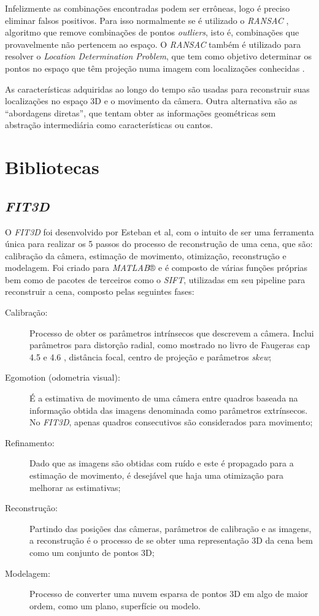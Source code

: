 Infelizmente as combinações encontradas podem ser errôneas, logo é preciso eliminar falsos positivos. Para isso normalmente se é utilizado o \textit{RANSAC} , algoritmo que remove combinações de pontos \textit{outliers}, isto é, combinações que provavelmente não pertencem ao espaço. O \textit{RANSAC} também é utilizado para resolver o \textit{Location Determination Problem}, que tem como objetivo determinar os pontos no espaço que têm projeção numa imagem com localizações conhecidas \cite{RANSAC}.

As características adquiridas ao longo do tempo são usadas para reconstruir suas localizações no espaço 3D e o movimento da câmera. Outra alternativa são as “abordagens diretas”, que tentam obter as informações geométricas sem abstração intermediária como características ou cantos.

\section{Bibliotecas}

\subsection{\textit{FIT3D}}
O \textit{FIT3D} foi desenvolvido por Esteban et al\cite{FIT3D}, com o intuito de ser uma ferramenta única para realizar os 5 passos do processo de reconstrução de uma cena, que são: calibração da câmera, estimação de movimento, otimização, reconstrução e modelagem. Foi criado para \textit{MATLAB}® e é composto de várias funções próprias bem como de pacotes de terceiros como o \textit{SIFT}, utilizadas em seu pipeline para reconstruir a cena, composto pelas seguintes fases:
\begin{description}
	\item[Calibração: ]{Processo de obter os parâmetros intrínsecos que descrevem a câmera. Inclui parâmetros para distorção radial, como mostrado no livro de Faugeras cap 4.5 e 4.6 \cite{Faugeras-Geometry}, distância focal, centro de projeção e parâmetros \textit{skew};}
	\item[Egomotion (odometria visual): ]{É a estimativa de movimento de uma câmera entre quadros baseada na informação obtida das imagens denominada como parâmetros extrínsecos. No \textit{FIT3D}, apenas quadros consecutivos são considerados para movimento;}
	\item[Refinamento: ]{Dado que as imagens são obtidas com ruído e este é propagado para a estimação de movimento, é desejável que haja uma otimização para melhorar as estimativas;}
	\item[Reconstrução: ]{Partindo das posições das câmeras, parâmetros de calibração e as imagens, a reconstrução é o processo de se obter uma representação 3D da cena bem como um conjunto de pontos 3D;}
	\item[Modelagem: ]{Processo de converter uma nuvem esparsa de pontos 3D em algo de maior ordem, como um plano, superfície ou modelo.}
\end{description}

